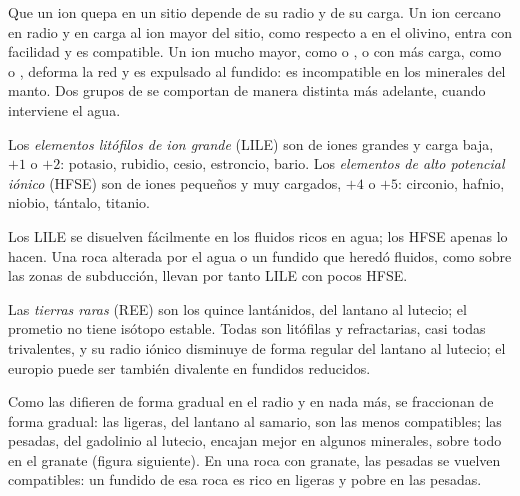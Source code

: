 Que un ion quepa en un sitio depende de su radio y de su carga. Un ion cercano en
radio y en carga al ion mayor del sitio, como  respecto a  en el
olivino, entra con facilidad y es compatible. Un ion mucho mayor, como
 o , o con más carga, como  o
, deforma la red y es expulsado al fundido: es
incompatible en los minerales del manto. Dos grupos de 
se comportan de manera distinta más adelante, cuando interviene el agua.

\begin{definition}
\label{def:b2:elements-in-the-earth:lile-hfse}
Los \emph{elementos litófilos de ion grande}
(LILE) son  de iones grandes y carga baja, $+1$ o $+2$:
potasio, rubidio, cesio, estroncio, bario. Los
\emph{elementos de alto potencial iónico} (HFSE)
son  de iones pequeños y muy cargados, $+4$ o $+5$:
circonio, hafnio, niobio, tántalo, titanio.
\end{definition}

Los LILE se disuelven fácilmente en los fluidos ricos en agua; los HFSE apenas lo hacen. Una roca
alterada por el agua o un fundido que heredó fluidos, como sobre las zonas de subducción,
llevan por tanto LILE con pocos HFSE.

\begin{definition}\label{def:b2:elements-in-the-earth:ree}
Las \emph{tierras raras} (REE) son los quince
lantánidos, del lantano al lutecio; el prometio no tiene isótopo estable. Todas
son litófilas y refractarias, casi todas trivalentes, y su radio iónico
disminuye de forma regular del lantano al lutecio; el europio puede ser también divalente en
fundidos reducidos.
\end{definition}

Como las  difieren de forma gradual en el radio y en nada más,
se fraccionan de forma gradual: las ligeras, del lantano al samario, son las menos
compatibles; las pesadas, del gadolinio al lutecio, encajan mejor en algunos
minerales, sobre todo en el granate (figura siguiente). En una roca con granate, las 
pesadas se vuelven compatibles: un fundido de esa roca es rico en  ligeras y
pobre en las pesadas.

